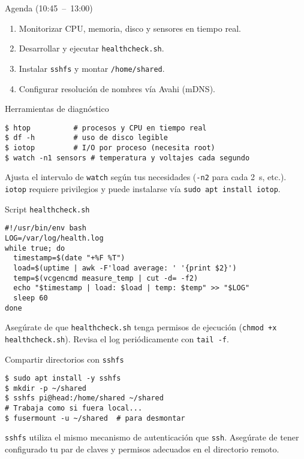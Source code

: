 \documentclass[aspectratio=169,professionalfonts]{beamer}
\begin{document}
\begin{frame}[fragile]{Agenda (10:45 – 13:00)}
  \begin{enumerate}
    \item Monitorizar CPU, memoria, disco y sensores en tiempo real.
    \item Desarrollar y ejecutar \texttt{healthcheck.sh}.
    \item Instalar \texttt{sshfs} y montar \texttt{/home/shared}.
    \item Configurar resolución de nombres vía Avahi (mDNS).
  \end{enumerate}
\end{frame}

\begin{frame}[fragile]{Herramientas de diagnóstico}
  \begin{verbatim}
$ htop          # procesos y CPU en tiempo real
$ df -h         # uso de disco legible
$ iotop         # I/O por proceso (necesita root)
$ watch -n1 sensors # temperatura y voltajes cada segundo
  \end{verbatim}
  \begin{infobox}
  Ajusta el intervalo de \texttt{watch} según tus necesidades (\texttt{-n2} para cada 2 s, etc.). \texttt{iotop} requiere privilegios y puede instalarse vía \texttt{sudo apt install iotop}.
  \end{infobox}
\end{frame}

\begin{frame}[fragile]{Script \texttt{healthcheck.sh}}
  \begin{verbatim}
#!/usr/bin/env bash
LOG=/var/log/health.log
while true; do
  timestamp=$(date "+%F %T")
  load=$(uptime | awk -F'load average: ' '{print $2}')
  temp=$(vcgencmd measure_temp | cut -d= -f2)
  echo "$timestamp | load: $load | temp: $temp" >> "$LOG"
  sleep 60
done
  \end{verbatim}
  \begin{warnbox}
  Asegúrate de que \texttt{healthcheck.sh} tenga permisos de ejecución (\texttt{chmod +x healthcheck.sh}). Revisa el log periódicamente con \texttt{tail -f}.
  \end{warnbox}
\end{frame}

\begin{frame}[fragile]{Compartir directorios con \texttt{sshfs}}
  \begin{verbatim}
$ sudo apt install -y sshfs
$ mkdir -p ~/shared
$ sshfs pi@head:/home/shared ~/shared
# Trabaja como si fuera local...
$ fusermount -u ~/shared  # para desmontar
  \end{verbatim}
  \begin{infobox}
  \texttt{sshfs} utiliza el mismo mecanismo de autenticación que \texttt{ssh}. Asegúrate de tener configurado tu par de claves y permisos adecuados en el directorio remoto.
  \end{infobox}
\end{frame}
\end{document}
